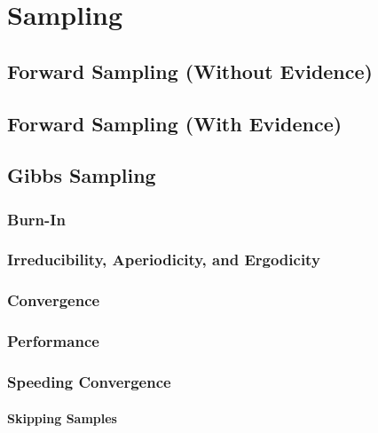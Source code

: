 	\section{Sampling} %

		\subsection{Forward Sampling (Without Evidence)} %

		\subsection{Forward Sampling (With Evidence)} %

		\subsection{Gibbs Sampling} %

			\subsubsection{Burn-In} %

			\subsubsection{Irreducibility, Aperiodicity, and Ergodicity} %

			\subsubsection{Convergence} %

			\subsubsection{Performance} %

			\subsubsection{Speeding Convergence} %

				\paragraph{Skipping Samples} %

